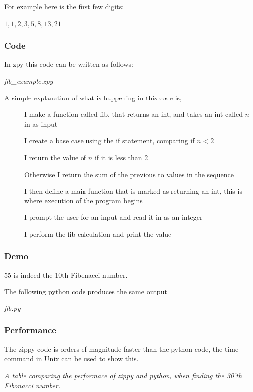 \documentclass[a4paper,12pt]{article}
\begin{document}
{For example here is the first few digits:

\(1, 1, 2, 3, 5, 8, 13, 21\)

\subsubsection{Code}
In zpy this code can be written as follows:


\textit{fib\_example.zpy}

A simple explanation of what is happening in this code is,

\begin{description}
	\item[] I make a function called fib, that returns an int, and takes an int called \(n\) in as input
	\item[] I create a base case using the if statement, comparing if \(n < 2\)
	\item[] I return the value of \(n\) if it is less than 2
	\item[] Otherwise I return the sum of the previous to values in the sequence
	
	\item[] I then define a main function that is marked as returning an int, this is where execution of the 
		program begins
	\item[] I prompt the user for an input and read it in as an integer
	\item[] I perform the fib calculation and print the value
\end{description}


\subsubsection{Demo}


55 is indeed the 10th Fibonacci number. 

The following python code produces the same output


\textit{fib.py}

\subsubsection{Performance}
The zippy code is orders of magnitude faster than the python code, the time command in Unix can be used to show this.

\begin{center}
\small{\textit{A table comparing the performace of zippy and python, when finding the 30'th Fibonacci number.}}
\end{center}
\begin{center}
\begin{bchart}[max=0.4]
	\smallskip
	\smallskip
\end{bchart}
\end{center}

}
\end{document}
